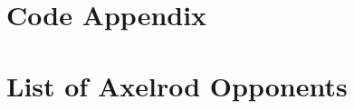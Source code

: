 \begin{appendices}
    \chapter{Code Appendix}
    
    \chapter{List of Axelrod Opponents}\label{apndx:opponents}
\end{appendices}